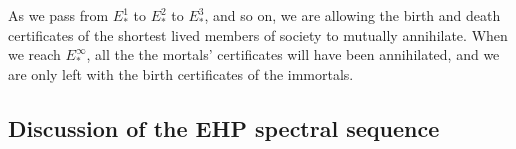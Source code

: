 \documentclass[11pt]{article}
\newcommand{\myheading}[1]
{{\noindent\Large #1}

}
\renewcommand{\myheading}[1]{\subsection{#1}}
\begin{document}
\begin{Births Deaths and Marriages}
As we pass from $E_*^1$ to $E_*^2$ to $E_*^3$, and so on, we are allowing the
birth and death certificates of the shortest lived members of society to
mutually annihilate. When we reach $E_*^\infty$, all the the mortals'
certificates will have been annihilated, and we are only left with the birth
certificates of the immortals.
%

\end{Births Deaths and Marriages}
\myheading{Discussion of the EHP spectral sequence}
\end{document}
